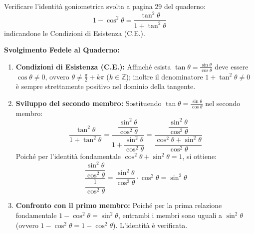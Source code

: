 \documentclass[11pt,a4paper,oneside]{report}
\begin{document}
\begin{esercizio}
Verificare l'identità goniometrica svolta a pagina 29 del quaderno:
\begin{equation}
    1 - \cos^2\theta = \frac{\tan^2\theta}{1 + \tan^2\theta}
\end{equation}
indicandone le Condizioni di Esistenza (C.E.).

\textbf{Svolgimento Fedele al Quaderno:}
\begin{enumerate}
    \item \textbf{Condizioni di Esistenza (C.E.):} Affinché esista $\tan\theta = \frac{\sin\theta}{\cos\theta}$ deve essere $\cos\theta \neq 0$, ovvero $\theta \neq \frac{\pi}{2} + k\pi$ ($k \in \mathbb{Z}$); inoltre il denominatore $1 + \tan^2\theta \neq 0$ è sempre strettamente positivo nel dominio della tangente.
    \item \textbf{Sviluppo del secondo membro:}
    Sostituendo $\tan\theta = \frac{\sin\theta}{\cos\theta}$ nel secondo membro:
    \begin{equation*}
        \frac{\tan^2\theta}{1 + \tan^2\theta} = \frac{\dfrac{\sin^2\theta}{\cos^2\theta}}{1 + \dfrac{\sin^2\theta}{\cos^2\theta}} = \frac{\dfrac{\sin^2\theta}{\cos^2\theta}}{\dfrac{\cos^2\theta + \sin^2\theta}{\cos^2\theta}}
    \end{equation*}
    Poiché per l'identità fondamentale $\cos^2\theta + \sin^2\theta = 1$, si ottiene:
    \begin{equation*}
        \frac{\dfrac{\sin^2\theta}{\cos^2\theta}}{\dfrac{1}{\cos^2\theta}} = \frac{\sin^2\theta}{\cos^2\theta} \cdot \cos^2\theta = \sin^2\theta
    \end{equation*}
    \item \textbf{Confronto con il primo membro:}
    Poiché per la prima relazione fondamentale $1 - \cos^2\theta = \sin^2\theta$, entrambi i membri sono uguali a $\sin^2\theta$ (ovvero $1 - \cos^2\theta = 1 - \cos^2\theta$). L'identità è verificata.
\end{enumerate}
\end{esercizio}
\end{document}
